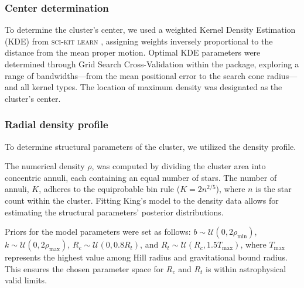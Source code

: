 \documentclass[fleqn,usenatbib,usedcolumn,useAMS]{mnras}
\begin{document}
\subsubsection{Center determination}
To  determine the cluster's center, we used a weighted Kernel Density Estimation (KDE) from \textsc{sci-kit learn} \citep{scikit-learn}, assigning weights inversely proportional to the distance from the mean proper motion. Optimal KDE parameters were determined through Grid Search Cross-Validation within the package, exploring a range of bandwidths—from the mean positional error to the search cone radius—and all kernel types. The location of maximum density was designated as the cluster's center.
\subsubsection{Radial density profile}
To determine structural parameters of the cluster, we utilized the \citet{1962AJ.....67..471K} density profile.

The numerical density $\rho$, was computed by dividing the cluster area into concentric annuli, each containing an equal number of stars. The number of annuli, $K$, adheres to the equiprobable bin rule ($K = 2n^{2/5}$), where $n$ is the star count within the cluster. Fitting King's model to the density data allows for estimating the structural parameters' posterior distributions.

Priors for the model parameters were set as follows: $b \sim \mathcal{U}(0, 2\rho_{\mathrm{min}})$, $k \sim \mathcal{U}(0, 2\rho_{\mathrm{max}})$, $R_c \sim \mathcal{U}(0, 0.8R_t)$, and $R_t \sim \mathcal{U}(R_c, 1.5T_{\mathrm{max}})$, where $T_{\mathrm{max}}$ represents the highest value among Hill radius and gravitational bound radius. This ensures the chosen parameter space for $R_c$ and $R_t$ is within astrophysical valid limits. 
\end{document}
